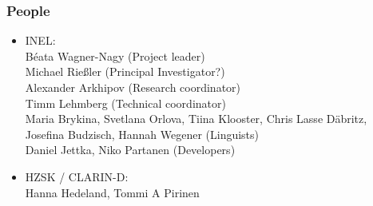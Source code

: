 \documentclass{beamer}
\begin{document}
\begin{frame}
    \frametitle{People}
    \begin{itemize}
        \item INEL: \\
            Béata Wagner-Nagy (Project leader)\\
            Michael Rießler (Principal Investigator?)\\
            Alexander Arkhipov (Research coordinator)\\
            Timm Lehmberg (Technical coordinator)\\
            Maria Brykina, Svetlana Orlova, Tiina Klooster, Chris Lasse Däbritz,
            Josefina Budzisch, Hannah Wegener (Linguists)\\
            Daniel Jettka, Niko Partanen (Developers)
        \item HZSK / CLARIN-D: \\
            Hanna Hedeland, Tommi A Pirinen
    \end{itemize}
\end{frame}
\end{document}
